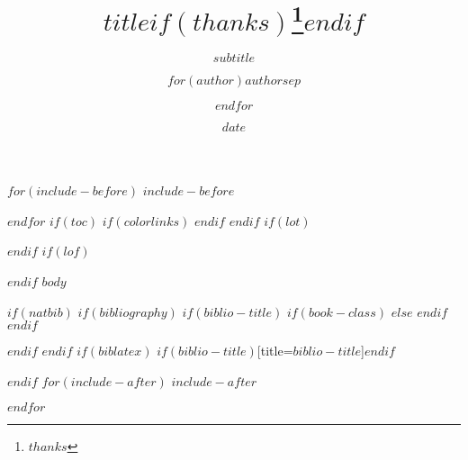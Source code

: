 \documentclass[a4paper,10.5pt,uplatex]{jsarticle}  %
\title{$title$$if(thanks)$\thanks{$thanks$}$endif$}
\subtitle{$subtitle$}
\author{$for(author)$$author$$sep$ \and $endfor$}
\institute{$for(institute)$$institute$$sep$ \and $endfor$}
\renewcommand{\refname}{参考文献}
\begin{document}
\title{}
\author{}
\date{$date$}
\maketitle


$for(include-before)$
$include-before$

$endfor$
$if(toc)$
{
$if(colorlinks)$
\hypersetup{linkcolor=$if(toccolor)$$toccolor$$else$black$endif$}
$endif$
\setcounter{tocdepth}{$toc-depth$}
\tableofcontents
}
$endif$
$if(lot)$
\listoftables
$endif$
$if(lof)$
\listoffigures
$endif$
$body$

$if(natbib)$
$if(bibliography)$
$if(biblio-title)$
$if(book-class)$
\renewcommand\bibname{$biblio-title$}
$else$
\renewcommand\refname{$biblio-title$}
$endif$
$endif$


$endif$
$endif$
$if(biblatex)$
\printbibliography$if(biblio-title)$[title=$biblio-title$]$endif$

$endif$
$for(include-after)$
$include-after$

$endfor$
\end{document}
